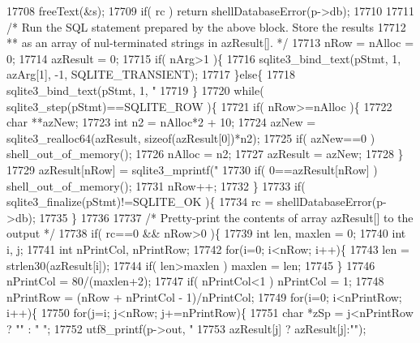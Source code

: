 \begin{DoxyCode}
{{{{{{{{{{{{{{{{{{{{{{{{{{{{{{{{{{{{{{{{{{{{{{{{{{{{{{{{{{{{{{{{{{{{{{{{{{{{{{{{{{{{{{{{{{{{{{{{{{{{{{{{{{{{{{{{{{{{{{{{{{{{{{{{{{{{{{{{17708     freeText(&s);
17709     \textcolor{keywordflow}{if}( rc ) \textcolor{keywordflow}{return} shellDatabaseError(p->db);
17710 
17711     \textcolor{comment}{/* Run the SQL statement prepared by the above block. Store the results}
17712 \textcolor{comment}{    ** as an array of nul-terminated strings in azResult[].  */}
17713     nRow = nAlloc = 0;
17714     azResult = 0;
17715     \textcolor{keywordflow}{if}( nArg>1 )\{
17716       sqlite3_bind_text(pStmt, 1, azArg[1], -1, SQLITE_TRANSIENT);
17717     \}\textcolor{keywordflow}{else}\{
17718       sqlite3_bind_text(pStmt, 1, \textcolor{stringliteral}{"%
17719     \}
17720     \textcolor{keywordflow}{while}( sqlite3_step(pStmt)==SQLITE_ROW )\{
17721       \textcolor{keywordflow}{if}( nRow>=nAlloc )\{
17722         \textcolor{keywordtype}{char} **azNew;
17723         \textcolor{keywordtype}{int} n2 = nAlloc*2 + 10;
17724         azNew = sqlite3_realloc64(azResult, \textcolor{keyword}{sizeof}(azResult[0])*n2);
17725         \textcolor{keywordflow}{if}( azNew==0 ) shell_out_of_memory();
17726         nAlloc = n2;
17727         azResult = azNew;
17728       \}
17729       azResult[nRow] = sqlite3_mprintf(\textcolor{stringliteral}{"%
17730       \textcolor{keywordflow}{if}( 0==azResult[nRow] ) shell_out_of_memory();
17731       nRow++;
17732     \}
17733     \textcolor{keywordflow}{if}( sqlite3_finalize(pStmt)!=SQLITE_OK )\{
17734       rc = shellDatabaseError(p->db);
17735     \}
17736 
17737     \textcolor{comment}{/* Pretty-print the contents of array azResult[] to the output */}
17738     \textcolor{keywordflow}{if}( rc==0 && nRow>0 )\{
17739       \textcolor{keywordtype}{int} len, maxlen = 0;
17740       \textcolor{keywordtype}{int} i, j;
17741       \textcolor{keywordtype}{int} nPrintCol, nPrintRow;
17742       \textcolor{keywordflow}{for}(i=0; i<nRow; i++)\{
17743         len = strlen30(azResult[i]);
17744         \textcolor{keywordflow}{if}( len>maxlen ) maxlen = len;
17745       \}
17746       nPrintCol = 80/(maxlen+2);
17747       \textcolor{keywordflow}{if}( nPrintCol<1 ) nPrintCol = 1;
17748       nPrintRow = (nRow + nPrintCol - 1)/nPrintCol;
17749       \textcolor{keywordflow}{for}(i=0; i<nPrintRow; i++)\{
17750         \textcolor{keywordflow}{for}(j=i; j<nRow; j+=nPrintRow)\{
17751           \textcolor{keywordtype}{char} *zSp = j<nPrintRow ? \textcolor{stringliteral}{""} : \textcolor{stringliteral}{"  "};
17752           utf8_printf(p->out, \textcolor{stringliteral}{"%
17753                       azResult[j] ? azResult[j]:\textcolor{stringliteral}{""});
}}}}}}}}}}}}}}}}}}}}}}}}}}}}}}}}}}}}}}}}}}}}}}}}}}}}}}}}}}}}}}}}}}}}}}}}}}}}}}}}}}}}}}}}}}}}}}}}}}}}}}}}}}}}}}}}}}}}}}}}}}}}}}}}}}}}}}}}}}}
\end{DoxyCode}
